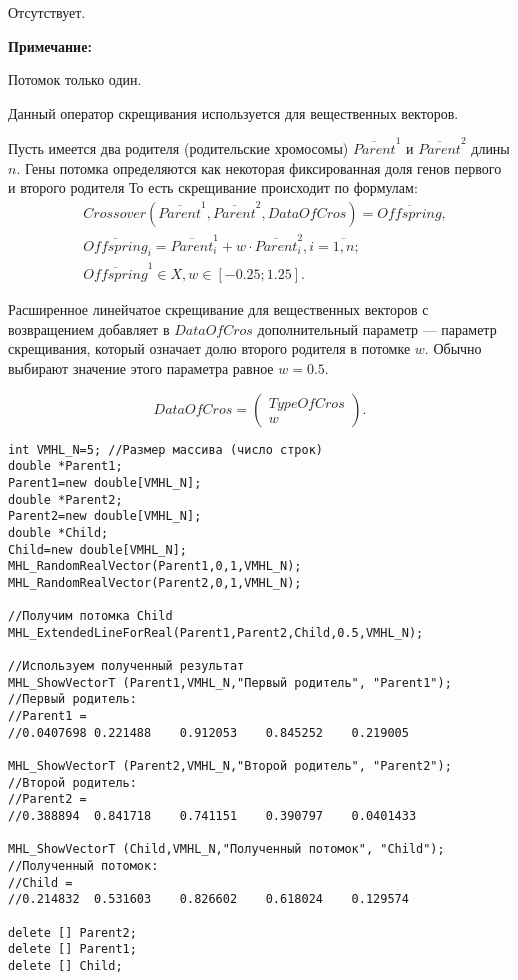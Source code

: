 \documentclass[a4paper,12pt]{article}
\begin{document}
 Отсутствует.
 
\textbf{ Примечание:}

 Потомок только один.
 
Данный оператор скрещивания используется для вещественных векторов.

Пусть имеется два родителя (родительские хромосомы) $ \overline{Parent}^1 $ и $ \overline{Parent}^2$ длины $n$. Гены потомка определяются как некоторая фиксированная доля генов первого и второго родителя То есть скрещивание происходит по формулам:
\begin{align}
\label{SetOfOperatorsAlgorithms:eq:ExtendedLineForReal}
&Crossover \left( \overline{Parent}^1, \overline{Parent}^2, DataOfCros\right)=\overline{Offspring}, \\
& \overline{Offspring}_i=\overline{Parent}^1_i+w\cdot\overline{Parent}^2_i , i=\overline{1,n};\nonumber\\
&\overline{Offspring}^1\in X, w\in \left[ -0.25; 1.25\right] .\nonumber
\end{align}

Расширенное линейчатое скрещивание для вещественных векторов с возвращением добавляет в $ DataOfCros $ дополнительный параметр --- параметр скрещивания, который означает долю второго родителя в потомке $ w $. Обычно выбирают значение этого параметра равное $ w=0.5 $.

\begin{equation}
DataOfCros=\left( \begin{array}{c} TypeOfCros \\ w \end{array} \right).
\end{equation}


\begin{lstlisting}[label=code_use_MHL_ExtendedLineForReal,caption=Пример использования]
int VMHL_N=5; //Размер массива (число строк)
double *Parent1;
Parent1=new double[VMHL_N];
double *Parent2;
Parent2=new double[VMHL_N];
double *Child;
Child=new double[VMHL_N];
MHL_RandomRealVector(Parent1,0,1,VMHL_N);
MHL_RandomRealVector(Parent2,0,1,VMHL_N);

//Получим потомка Child
MHL_ExtendedLineForReal(Parent1,Parent2,Child,0.5,VMHL_N);

//Используем полученный результат
MHL_ShowVectorT (Parent1,VMHL_N,"Первый родитель", "Parent1");
//Первый родитель:
//Parent1 =
//0.0407698	0.221488	0.912053	0.845252	0.219005

MHL_ShowVectorT (Parent2,VMHL_N,"Второй родитель", "Parent2");
//Второй родитель:
//Parent2 =
//0.388894	0.841718	0.741151	0.390797	0.0401433

MHL_ShowVectorT (Child,VMHL_N,"Полученный потомок", "Child");
//Полученный потомок:
//Child =
//0.214832	0.531603	0.826602	0.618024	0.129574

delete [] Parent2;
delete [] Parent1;
delete [] Child;
\end{lstlisting}
\end{document}
